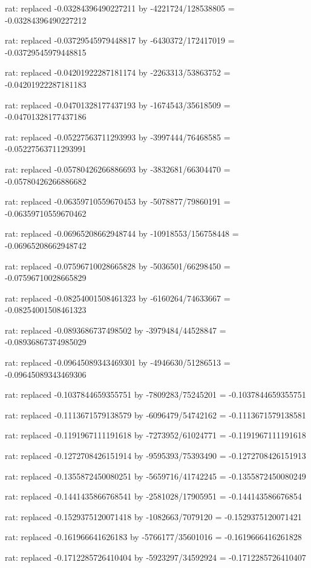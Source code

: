 \documentclass[a4paper,10pt]{article}
\begin{document}
\begin{eulernotebook}
\begin{eulercomment}
\begin{eulercomment}
\begin{eulercomment}
\begin{eulercomment}
\begin{eulercomment}
\begin{eulercomment}
\begin{eulercomment}
\begin{eulercomment}
\begin{eulercomment}
\begin{eulercomment}
\begin{eulercomment}
\begin{eulercomment}
\begin{eulercomment}
\begin{eulercomment}
\begin{eulercomment}
\begin{eulercomment}
\begin{euleroutput}
  rat: replaced -0.03284396490227211 by -4221724/128538805 = -0.03284396490227212
  
  rat: replaced -0.03729545979448817 by -6430372/172417019 = -0.03729545979448815
  
  rat: replaced -0.04201922287181174 by -2263313/53863752 = -0.04201922287181183
  
  rat: replaced -0.04701328177437193 by -1674543/35618509 = -0.04701328177437186
  
  rat: replaced -0.05227563711293993 by -3997444/76468585 = -0.05227563711293991
  
  rat: replaced -0.05780426266886693 by -3832681/66304470 = -0.05780426266886682
  
  rat: replaced -0.06359710559670453 by -5078877/79860191 = -0.06359710559670462
  
  rat: replaced -0.06965208662948744 by -10918553/156758448 = -0.06965208662948742
  
  rat: replaced -0.07596710028665828 by -5036501/66298450 = -0.07596710028665829
  
  rat: replaced -0.08254001508461323 by -6160264/74633667 = -0.08254001508461323
  
  rat: replaced -0.0893686737498502 by -3979484/44528847 = -0.08936867374985029
  
  rat: replaced -0.09645089343469301 by -4946630/51286513 = -0.09645089343469306
  
  rat: replaced -0.1037844659355751 by -7809283/75245201 = -0.1037844659355751
  
  rat: replaced -0.1113671579138579 by -6096479/54742162 = -0.1113671579138581
  
  rat: replaced -0.1191967111191618 by -7273952/61024771 = -0.1191967111191618
  
  rat: replaced -0.1272708426151914 by -9595393/75393490 = -0.1272708426151913
  
  rat: replaced -0.1355872450080251 by -5659716/41742245 = -0.1355872450080249
  
  rat: replaced -0.1441435866768541 by -2581028/17905951 = -0.144143586676854
  
  rat: replaced -0.1529375120071418 by -1082663/7079120 = -0.1529375120071421
  
  rat: replaced -0.161966641626183 by -5766177/35601016 = -0.1619666416261828
  
  rat: replaced -0.1712285726410404 by -5923297/34592924 = -0.1712285726410407
  

\end{euleroutput}
\end{eulercomment}
\end{eulercomment}
\end{eulercomment}
\end{eulercomment}
\end{eulercomment}
\end{eulercomment}
\end{eulercomment}
\end{eulercomment}
\end{eulercomment}
\end{eulercomment}
\end{eulercomment}
\end{eulercomment}
\end{eulercomment}
\end{eulercomment}
\end{eulercomment}
\end{eulercomment}
\end{eulernotebook}
\end{document}
